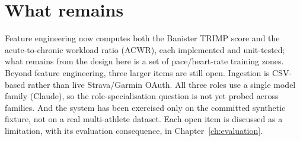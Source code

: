 \section{What remains}

Feature engineering now computes both the Banister TRIMP score and the acute-to-chronic workload ratio (ACWR), each implemented and unit-tested; what remains from the design here is a set of pace/heart-rate training zones. Beyond feature engineering, three larger items are still open. Ingestion is CSV-based rather than live Strava/Garmin OAuth. All three roles use a single model family (Claude), so the role-specialisation question is not yet probed across families. And the system has been exercised only on the committed synthetic fixture, not on a real multi-athlete dataset. Each open item is discussed as a limitation, with its evaluation consequence, in Chapter~\ref{ch:evaluation}.
